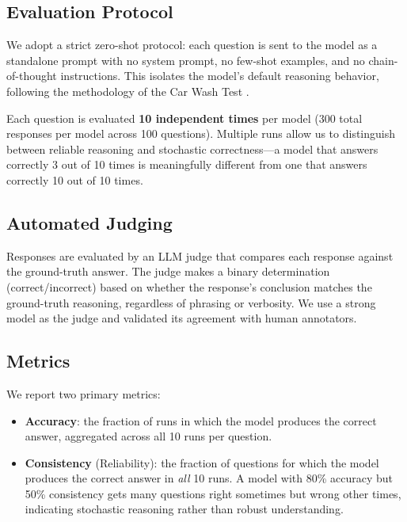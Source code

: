 \documentclass[11pt]{article}
\begin{document}
\subsection{Evaluation Protocol}

We adopt a strict zero-shot protocol: each question is sent to the model as a standalone prompt with no system prompt, no few-shot examples, and no chain-of-thought instructions. This isolates the model's default reasoning behavior, following the methodology of the Car Wash Test \citep{opper2025carwash}.

Each question is evaluated \textbf{10 independent times} per model (300 total responses per model across 100 questions). Multiple runs allow us to distinguish between reliable reasoning and stochastic correctness---a model that answers correctly 3 out of 10 times is meaningfully different from one that answers correctly 10 out of 10 times.

\subsection{Automated Judging}

Responses are evaluated by an LLM judge that compares each response against the ground-truth answer. The judge makes a binary determination (correct/incorrect) based on whether the response's conclusion matches the ground-truth reasoning, regardless of phrasing or verbosity. We use a strong model as the judge and validated its agreement with human annotators.

\subsection{Metrics}

We report two primary metrics:

\begin{itemize}[leftmargin=*, itemsep=2pt]
  \item \textbf{Accuracy}: the fraction of runs in which the model produces the correct answer, aggregated across all 10 runs per question.
  \item \textbf{Consistency} (Reliability): the fraction of questions for which the model produces the correct answer in \emph{all} 10 runs. A model with 80\% accuracy but 50\% consistency gets many questions right sometimes but wrong other times, indicating stochastic reasoning rather than robust understanding.
\end{itemize}
\end{document}
